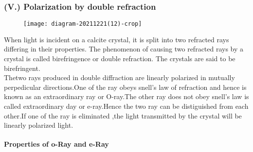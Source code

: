       \subsubsection{(V.) Polarization by double refraction}
     \begin{figure}[H]
     	\centering
     	\texttt{[image: diagram-20211221(12)-crop]}
     	\caption{}
     	\label{}
     \end{figure}
  When light is incident on a calcite crystal, it is split into two refracted rays differing in their properties. The phenomenon of causing two refracted rays by a crystal is called birefringence or double refraction. The crystals are said to be birefringent.\\
  Thetwo rays produced in double diffraction are linearly polarized in mutually perpedicular directions.One of the ray obeys snell's law of refraction and hence is known as an extraordinary ray or O-ray.The other ray does not obey snell's law is called extraordinary day or e-ray.Hence the two ray can be distiguished from each other.If one of the ray is eliminated ,the light transmitted by the crystal will be linearly polarized light.\\\\
  \textbf{Properties of o-Ray and e-Ray}
